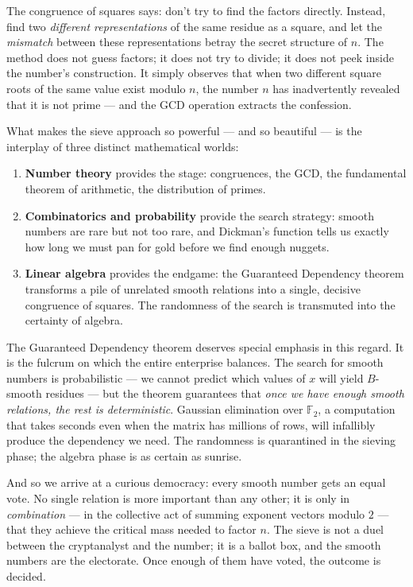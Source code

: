 The congruence of squares says: don't try to find the factors directly. Instead, find two \emph{different representations} of the same residue as a square, and let the \emph{mismatch} between these representations betray the secret structure of \(n\). The method does not guess factors; it does not try to divide; it does not peek inside the number's construction. It simply observes that when two different square roots of the same value exist modulo \(n\), the number \(n\) has inadvertently revealed that it is not prime --- and the GCD operation extracts the confession.

What makes the sieve approach so powerful --- and so beautiful --- is the interplay of three distinct mathematical worlds:

\begin{enumerate}
\def\labelenumi{\arabic{enumi}.}
\item
  \textbf{Number theory} provides the stage: congruences, the GCD, the fundamental theorem of arithmetic, the distribution of primes.
\item
  \textbf{Combinatorics and probability} provide the search strategy: smooth numbers are rare but not too rare, and Dickman's function tells us exactly how long we must pan for gold before we find enough nuggets.
\item
  \textbf{Linear algebra} provides the endgame: the Guaranteed Dependency theorem transforms a pile of unrelated smooth relations into a single, decisive congruence of squares. The randomness of the search is transmuted into the certainty of algebra.
\end{enumerate}

The Guaranteed Dependency theorem deserves special emphasis in this regard. It is the fulcrum on which the entire enterprise balances. The search for smooth numbers is probabilistic --- we cannot predict which values of \(x\) will yield \(B\)-smooth residues --- but the theorem guarantees that \emph{once we have enough smooth relations, the rest is deterministic}. Gaussian elimination over \(\mathbb{F}_2\), a computation that takes seconds even when the matrix has millions of rows, will infallibly produce the dependency we need. The randomness is quarantined in the sieving phase; the algebra phase is as certain as sunrise.

And so we arrive at a curious democracy: every smooth number gets an equal vote. No single relation is more important than any other; it is only in \emph{combination} --- in the collective act of summing exponent vectors modulo \(2\) --- that they achieve the critical mass needed to factor \(n\). The sieve is not a duel between the cryptanalyst and the number; it is a ballot box, and the smooth numbers are the electorate. Once enough of them have voted, the outcome is decided.


